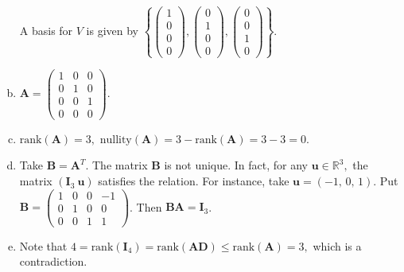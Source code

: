 \documentclass{article}
\newcommand{\matr}[1]{\mathbf{#1}}
\begin{document}
\begin{enumerate}[(a)]
    A basis for $V$ is given by $\left\{\begin{pmatrix}1\\0\\0\\0\end{pmatrix},\begin{pmatrix}0\\1\\0\\0\end{pmatrix},\begin{pmatrix}0\\0\\1\\0\end{pmatrix}\right\}.$
    \item $\matr{A}=\begin{pmatrix}1&0&0\\0&1&0\\0&0&1\\0&0&0\end{pmatrix}.$
    \item $\text{rank}(\matr{A})=3,$ $\text{nullity}(\matr{A})=3-\text{rank}(\matr{A})=3-3=0.$
    \item Take $\matr{B}=\matr{A}^T.$ The matrix $\matr{B}$ is not unique. In fact, for any $\matr{u}\in\mathbb{R}^3,$ the matrix $(\matr{I}_3\ \matr{u})$ satisfies the relation. For instance, take $\matr u = \left(-1,\,0,\,1\right)$. Put $\matr B= \left(\begin{array}{rrrr}
    1 & 0 & 0 & -1 \\
    0 & 1 & 0 & 0 \\
    0 & 0 & 1 & 1
    \end{array}\right)$. Then $\matr B \matr A = \matr I_3$.
    \item Note that $4=\text{rank}(\matr{I}_4)=\text{rank}(\matr{AD})\leq\text{rank}(\matr{A})=3,$ which is a contradiction.
\end{enumerate}
\end{document}
